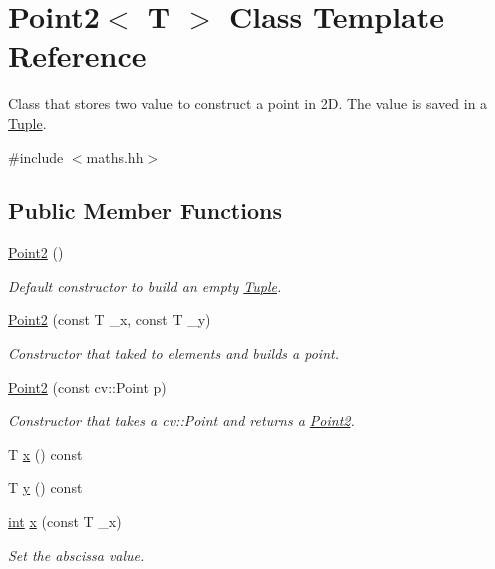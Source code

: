\hypertarget{class_point2}{}\section{Point2$<$ T $>$ Class Template Reference}
\label{class_point2}


Class that stores two value to construct a point in 2D. The value is saved in a \mbox{\hyperlink{class_tuple}{Tuple}}.  




{\ttfamily \#include $<$maths.\+hh$>$}

\subsection*{Public Member Functions}
\begin{DoxyCompactItemize}
\item 
\mbox{\hyperlink{class_point2_a4674f9e2fab693fc83afd5af234100d3}{Point2}} ()
\begin{DoxyCompactList}\small\item\em Default constructor to build an empty \mbox{\hyperlink{class_tuple}{Tuple}}. \end{DoxyCompactList}\item 
\mbox{\hyperlink{class_point2_ae743063a4348bef19448aabf90901cb3}{Point2}} (const T \+\_\+x, const T \+\_\+y)
\begin{DoxyCompactList}\small\item\em Constructor that taked to elements and builds a point. \end{DoxyCompactList}\item 
\mbox{\hyperlink{class_point2_a436478e578e6c7df9ea1bf1136ad8764}{Point2}} (const cv\+::\+Point p)
\begin{DoxyCompactList}\small\item\em Constructor that takes a cv\+::\+Point and returns a \mbox{\hyperlink{class_point2}{Point2}}. \end{DoxyCompactList}\item 
T \mbox{\hyperlink{class_point2_adbf149d6f50de0d91c714a3fc45a80c5}{x}} () const
\item 
T \mbox{\hyperlink{class_point2_ad7138ca15abc7937b9b1fdb0a84d229c}{y}} () const
\item 
\mbox{\hyperlink{draw_8hh_aa620a13339ac3a1177c86edc549fda9b}{int}} \mbox{\hyperlink{class_point2_a3e62033b920c32928e71c6d357425761}{x}} (const T \+\_\+x)
\begin{DoxyCompactList}\small\item\em Set the abscissa value. \end{DoxyCompactList}\item 

\end{DoxyCompactItemize}
